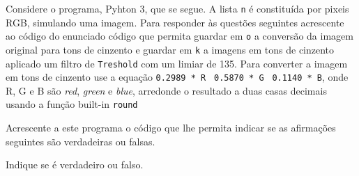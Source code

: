 \documentclass[12pt,varwidth=16cm,border=1pt]{standalone}
\begin{document}
Considere o programa, Pyhton 3, que se segue. A lista \verb+n+ é constituída por pixeis RGB, simulando uma imagem. Para responder às questões seguintes acrescente ao código do enunciado código que permita guardar em \verb+o+ a conversão da imagem original para tons de cinzento e guardar em \verb+k+ a imagens em tons de cinzento aplicado um filtro de \verb+Treshold+ com um limiar de 135. Para converter a imagem em tons de cinzento use a equação \verb+0.2989 * R + \verb+0.5870 * G + \verb+0.1140 * B+, onde R, G e B são \textit{red}, \textit{green} e \textit{blue}, arredonde o resultado a duas casas decimais usando a função built-in \verb+round+



Acrescente a este programa o código que lhe permita indicar se as
afirmações seguintes são verdadeiras ou falsas.

Indique se é verdadeiro ou falso.
\end{document}
